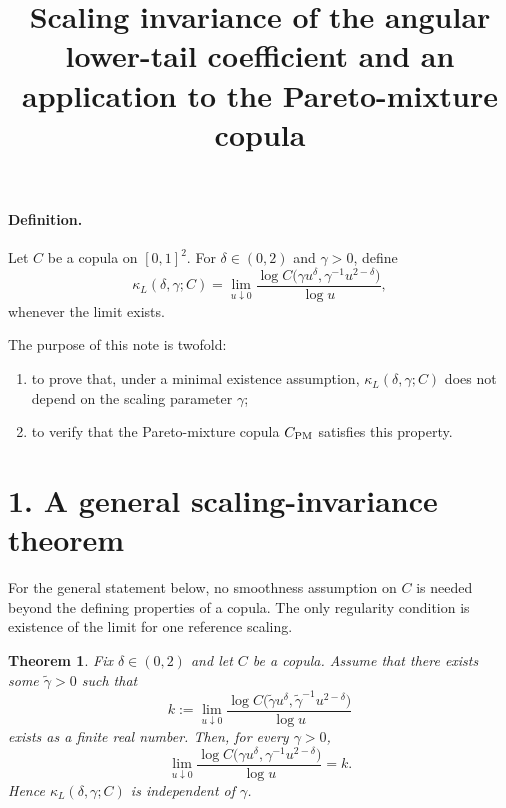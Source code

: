 \documentclass[11pt]{article}
\newtheorem{theorem}{Theorem}
\begin{document}
\title{Scaling invariance of the angular lower-tail coefficient and an application to the Pareto-mixture copula}
\author{}
\date{}
\maketitle

\paragraph{Definition.}
Let $C$ be a copula on $[0,1]^2$. For $\delta\in(0,2)$ and $\gamma>0$, define
\[
\kappa_L(\delta,\gamma;C)
=
\lim_{u\downarrow 0}
\frac{\log C\!\bigl(\gamma u^\delta,\gamma^{-1}u^{2-\delta}\bigr)}{\log u},
\]
whenever the limit exists.

The purpose of this note is twofold:
\begin{enumerate}
    \item to prove that, under a minimal existence assumption, $\kappa_L(\delta,\gamma;C)$ does not depend on the scaling parameter $\gamma$;
    \item to verify that the Pareto-mixture copula $C_{\rm PM}$ satisfies this property.
\end{enumerate}

\section*{1. A general scaling-invariance theorem}

For the general statement below, no smoothness assumption on $C$ is needed beyond the defining properties of a copula. The only regularity condition is existence of the limit for one reference scaling.

\begin{theorem}\label{thm:gamma-invariance}
Fix $\delta\in(0,2)$ and let $C$ be a copula. Assume that there exists some $\tilde\gamma>0$ such that
\[
k
:=
\lim_{u\downarrow 0}
\frac{\log C\!\bigl(\tilde\gamma u^\delta,\tilde\gamma^{-1}u^{2-\delta}\bigr)}{\log u}
\]
exists as a finite real number. Then, for every $\gamma>0$,
\[
\lim_{u\downarrow 0}
\frac{\log C\!\bigl(\gamma u^\delta,\gamma^{-1}u^{2-\delta}\bigr)}{\log u}
=
k.
\]
Hence $\kappa_L(\delta,\gamma;C)$ is independent of $\gamma$.
\end{theorem}
\end{document}
